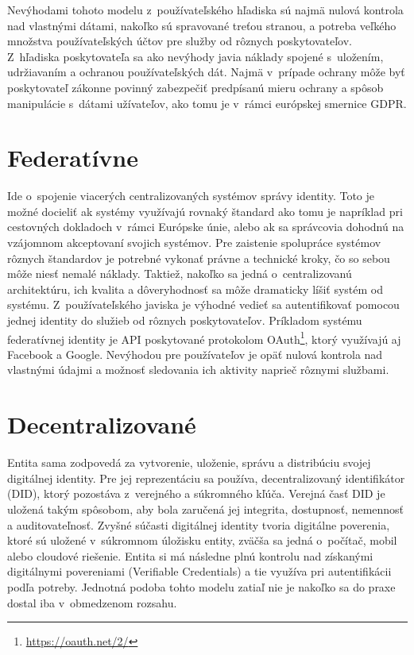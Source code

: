 Nevýhodami tohoto modelu z~používateľského hľadiska sú najmä nulová kontrola nad vlastnými dátami, nakoľko sú spravované treťou stranou, a potreba veľkého množstva používateľských účtov pre služby od rôznych poskytovateľov. Z~hľadiska poskytovateľa sa ako nevýhody javia náklady spojené s~uložením, udržiavaním a ochranou používateľských dát. Najmä v~prípade ochrany môže byť poskytovateľ zákonne povinný zabezpečiť predpísanú mieru ochrany a spôsob manipulácie s~dátami užívateľov, ako tomu je v~rámci európskej smernice GDPR.

\section{Federatívne}

Ide o~spojenie viacerých centralizovaných systémov správy identity. Toto je možné docieliť ak systémy využívajú rovnaký štandard ako tomu je napríklad pri cestovných dokladoch v~rámci Európske únie, alebo ak sa správcovia dohodnú na vzájomnom akceptovaní svojich systémov. Pre zaistenie spolupráce systémov rôznych štandardov je potrebné vykonať právne a technické kroky, čo so sebou môže niesť nemalé náklady. Taktiež, nakoľko sa jedná o~centralizovanú architektúru, ich kvalita a dôveryhodnosť sa môže dramaticky líšiť systém od systému. Z~používateľského javiska je výhodné vedieť sa autentifikovať pomocou jednej identity do služieb od rôznych poskytovateľov. Príkladom systému federatívnej identity je API poskytované protokolom OAuth\footnote{\url{https://oauth.net/2/}}, ktorý využívajú aj Facebook a Google. Nevýhodou pre používateľov je opäť nulová kontrola nad vlastnými údajmi a možnosť sledovania ich aktivity naprieč rôznymi službami.

\section{Decentralizované}

Entita sama zodpovedá za vytvorenie, uloženie, správu a distribúciu svojej digitálnej identity. Pre jej reprezentáciu sa používa, decentralizovaný identifikátor (DID), ktorý pozostáva z~verejného a súkromného kľúča. Verejná časť DID je uložená takým spôsobom, aby bola zaručená jej integrita, dostupnosť, nemennosť a auditovateľnosť. Zvyšné súčasti digitálnej identity tvoria digitálne poverenia, ktoré sú uložené v~súkromnom úložisku entity, zväčša sa jedná o~počítač, mobil alebo cloudové riešenie. Entita si má následne plnú kontrolu nad získanými digitálnymi povereniami (Verifiable Credentials) a tie využíva pri autentifikácii podľa potreby. Jednotná podoba tohto modelu zatiaľ nie je nakoľko sa do praxe dostal iba v~obmedzenom rozsahu.

